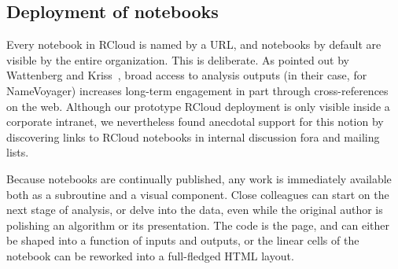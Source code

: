 \subsection{Deployment of notebooks\label{sec:deployment}}

Every notebook in RCloud is named by a URL, and notebooks by
default are visible by the entire organization. This is deliberate.
As pointed out by Wattenberg and Kriss~\cite{Wattenberg:2011:DFS},
broad access to analysis outputs (in their case, for NameVoyager)
increases long-term engagement in part through cross-references on
the web. Although our prototype RCloud deployment is only visible
inside a corporate intranet, we nevertheless found anecdotal support
for this notion by discovering links to RCloud notebooks in internal
discussion fora and mailing lists.

Because notebooks are continually published, any work is immediately
available both as a subroutine and a visual component. Close colleagues
can start on the next stage of analysis, or delve into the data,
even while the original author is polishing an algorithm or its
presentation. 
The code is the page, and can either be shaped into
a function of inputs and outputs, or the linear cells of the notebook
can be reworked into a full-fledged HTML layout.
